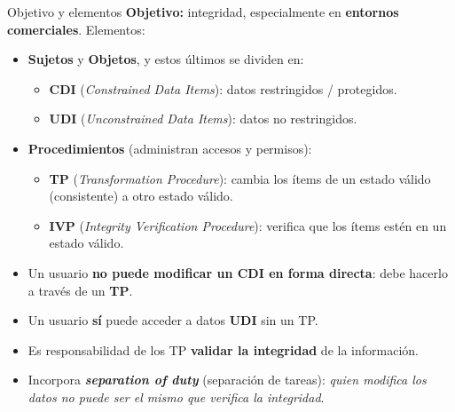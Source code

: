 \documentclass[11pt,a4paper]{article}
\begin{document}
\begin{defbox}{Objetivo y elementos}
\textbf{Objetivo:} integridad, especialmente en \textbf{entornos comerciales}. Elementos:
\begin{itemize}[leftmargin=1.4em,itemsep=2pt]
  \item \textbf{Sujetos} y \textbf{Objetos}, y estos últimos se dividen en:
    \begin{itemize}[leftmargin=1.2em,itemsep=1pt]
      \item \textbf{CDI} (\emph{Constrained Data Items}): datos restringidos / protegidos.
      \item \textbf{UDI} (\emph{Unconstrained Data Items}): datos no restringidos.
    \end{itemize}
  \item \textbf{Procedimientos} (administran accesos y permisos):
    \begin{itemize}[leftmargin=1.2em,itemsep=1pt]
      \item \textbf{TP} (\emph{Transformation Procedure}): cambia los ítems de un estado
            válido (consistente) a otro estado válido.
      \item \textbf{IVP} (\emph{Integrity Verification Procedure}): verifica que los ítems
            estén en un estado válido.
    \end{itemize}
\end{itemize}
\end{defbox}

\begin{slidebox}
\begin{itemize}[leftmargin=1.4em,itemsep=2pt]
  \item Un usuario \textbf{no puede modificar un CDI en forma directa}: debe hacerlo a través
        de un \textbf{TP}.
  \item Un usuario \textbf{sí} puede acceder a datos \textbf{UDI} sin un TP.
  \item Es responsabilidad de los TP \textbf{validar la integridad} de la información.
  \item Incorpora \textbf{\emph{separation of duty}} (separación de tareas): \emph{quien
        modifica los datos no puede ser el mismo que verifica la integridad}.
\end{itemize}
\end{slidebox}
\end{document}
